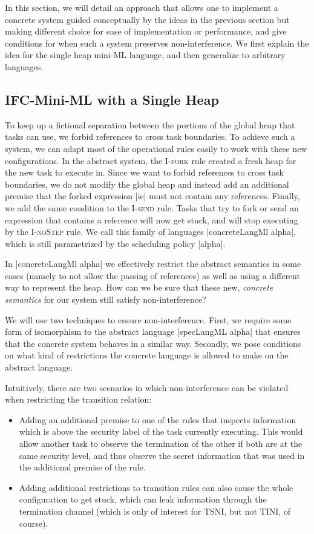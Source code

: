 In this section, we will detail an approach that allows one to implement
a concrete system guided conceptually by the ideas in the previous
section but making different choice for ease of implementation or
performance, and give conditions for when such a system preserves
non-interference.
We first explain the idea for the single heap mini-ML language, and then
generalize to arbitrary languages.

\subsection{IFC-Mini-ML with a Single Heap}

To keep up a fictional separation between the portions
of the global heap that tasks can use, we forbid references to
cross task boundaries.  To achieve such a system, we can
adapt most of the operational rules easily to work with these
new configurations.  In the abstract system, the \textsc{I-fork}
rule created a fresh heap for the new task to execute in.  Since we
want to forbid references to cross task boundaries, we do not modify
the global heap and instead add an additional premise that the forked
expression |ie| must not contain any references.
Finally, we add the same condition to the \textsc{I-send} rule.
Tasks that try to fork or send an expression that contains a
reference will now get stuck, and will stop executing by the
\textsc{I-noStep} rule.
We call this family of languages |concreteLangMl alpha|, which
is still parametrized by the scheduling policy |alpha|.


In |concreteLangMl alpha| we
effectively restrict the abstract semantics in some cases (namely
to not allow the passing of references) as well as using a different
way to represent the heap.  How can we be sure that these
new, \textit{concrete semantics} for our system still satisfy
non-interference?

We will use two techniques to ensure non-interference.  First,
we require some form of isomorphism to the abstract language
|specLangML alpha| that ensures that the concrete system behaves
in a similar way.  Secondly, we pose conditions on what kind
of restrictions the concrete language is allowed to make
on the abstract language.

Intuitively, there are two scenarios in which non-interference
can be violated when restricting the transition relation:
\begin{itemize}
  \item Adding an additional premise to one of the rules that inspects
  information which is above the security label of the task currently
  executing.  This would allow another task to observe the termination
  of the other if both are at the same security level, and thus observe
  the secret information that was used in the additional
  premise of the rule.
  \item Adding additional restrictions to transition rules can
  also cause the whole configuration to get stuck, which can leak
  information through the termination channel (which is only
  of interest for TSNI, but not TINI, of course).
\end{itemize}

